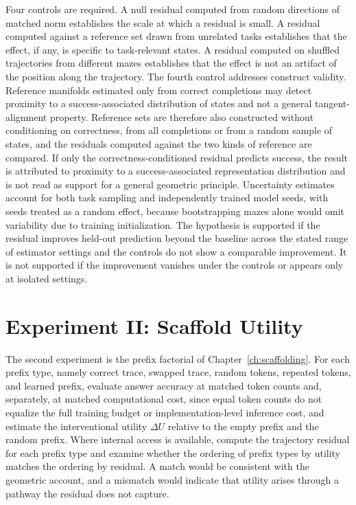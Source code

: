 Four controls are required. A null residual computed from random directions of matched norm establishes the scale at which a residual is small. A residual computed against a reference set drawn from unrelated tasks establishes that the effect, if any, is specific to task-relevant states. A residual computed on shuffled trajectories from different mazes establishes that the effect is not an artifact of the position along the trajectory. The fourth control addresses construct validity. Reference manifolds estimated only from correct completions may detect proximity to a success-associated distribution of states and not a general tangent-alignment property. Reference sets are therefore also constructed without conditioning on correctness, from all completions or from a random sample of states, and the residuals computed against the two kinds of reference are compared. If only the correctness-conditioned residual predicts success, the result is attributed to proximity to a success-associated representation distribution and is not read as support for a general geometric principle. Uncertainty estimates account for both task sampling and independently trained model seeds, with seeds treated as a random effect, because bootstrapping mazes alone would omit variability due to training initialization. The hypothesis is supported if the residual improves held-out prediction beyond the baseline across the stated range of estimator settings and the controls do not show a comparable improvement. It is not supported if the improvement vanishes under the controls or appears only at isolated settings.

\section{Experiment II: Scaffold Utility}

The second experiment is the prefix factorial of Chapter~\ref{ch:scaffolding}. For each prefix type, namely correct trace, swapped trace, random tokens, repeated tokens, and learned prefix, evaluate answer accuracy at matched token counts and, separately, at matched computational cost, since equal token counts do not equalize the full training budget or implementation-level inference cost, and estimate the interventional utility $\Delta U$ relative to the empty prefix and the random prefix. Where internal access is available, compute the trajectory residual for each prefix type and examine whether the ordering of prefix types by utility matches the ordering by residual. A match would be consistent with the geometric account, and a mismatch would indicate that utility arises through a pathway the residual does not capture.

